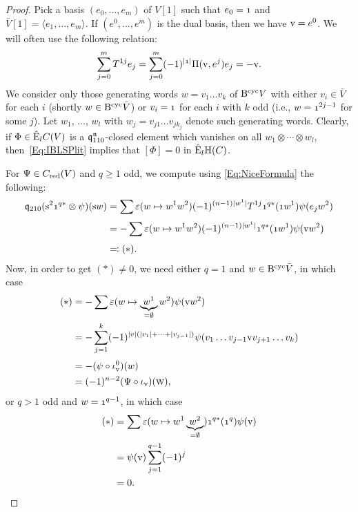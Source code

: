 \documentclass[\MainFolder/Text.tex]{subfiles}
\begin{document}
\begin{proof}
Pick a basis $(e_0, \dotsc, e_m)$ of $V[1]$ such that $e_0 = \NOne$ and $\bar{V}[1] = \langle e_1, \dotsc, e_m \rangle$. If $(e^0,\dotsc,e^m)$ is the dual basis, then we have $\mathrm{v} = e^0$. We will often use the following relation:
\begin{equation}\label{Eq:NiceFormula}
 \sum_{j=0}^m T^{1j} e_j = \sum_{j=0}^m (-1)^{\Abs{\NOne}} \Pair(\NVol,e^j) e_j =  - \NVol.
\end{equation}
We consider only those generating words $w = v_1 \dotsc v_k$ of $\mathrm{B}^{\mathrm{cyc}} V$ with either $v_i\in \bar{V}$ for each $i$ (shortly $w\in \mathrm{B}^{\mathrm{cyc}} \bar{V}$) or $v_i = \NOne$ for each $i$ with $k$ odd (i.e., $w=\NOne^{2j-1}$ for some $j$). Let $w_1$, $\dotsc$, $w_l$ with $w_j = v_{j 1} \dots v_{j k_j}$ denote such generating words. Clearly, if $\Phi \in \hat{\mathrm{E}}_l C(V)$ is a $\mathfrak{q}_{110}^{\mathfrak{n}}$-closed element which vanishes on all $w_1 \otimes \dotsb \otimes w_l$, then~\eqref{Eq:IBLSPlit} implies that $[\Phi] = 0$ in $\hat{\mathrm{E}}_l\mathbb{H}(C)$.

For $\Psi\in C_{\mathrm{red}}(V)$ and $q\ge 1$ odd, we compute using \eqref{Eq:NiceFormula} the following:
\allowdisplaybreaks
\begin{align*}
\OPQ_{210}(\Susp^2 \NOne^{q*}\otimes \psi)(\Susp w)  &= \sum \varepsilon( w\mapsto w^1 w^2)(-1)^{(n-1)\Abs{w^1}}T^{1j}\NOne^{q*}(\NOne w^1) \psi(e_j w^2) \\[\jot]
&= -\sum \varepsilon( w\mapsto w^1 w^2)(-1)^{(n-1)\Abs{w^1}}\NOne^{q*}(\NOne w^1) \psi(\NVol w^2)\\[\jot]
&\eqqcolon(*). 
\end{align*}
Now, in order to get $(*)\neq 0$, we need either $q=1$ and $w\in \mathrm{B}^{\mathrm{cyc}} \bar{V}$, in which case
\allowdisplaybreaks
\begin{align*}
 (*)&=-\sum \varepsilon(w\mapsto \underbrace{w^1}_{=\emptyset} w^2)\psi(\mathrm{v} w^2) \\ &= -\sum_{j=1}^k (-1)^{|v|(|v_1| + \dotsb + |v_{j-1}|)} \psi(v_1 \dotsc v_{j-1} \mathrm{v} v_{j+1}\dotsc v_k) \\[\jot]
 &=  - (\psi \circ \iota^0_{\mathrm{v}})(w) \\
 &= (-1)^{n-2} (\Psi \circ \iota_{\mathrm{v}})(\text{\footnotesize W}),
\end{align*}
or $q>1$ odd and $w = \NOne^{q-1}$, in which case
\allowdisplaybreaks
\begin{align*}
 (*) &= \sum \varepsilon(w\mapsto w^1 \underbrace{w^2}_{=\emptyset}) \NOne^{q*}(\NOne^q) \psi(\NVol) \\
 &= \psi(\NVol) \sum_{j=1}^{q-1} (-1)^j \\
 & = 0.
\end{align*}


\end{proof}
\end{document}
